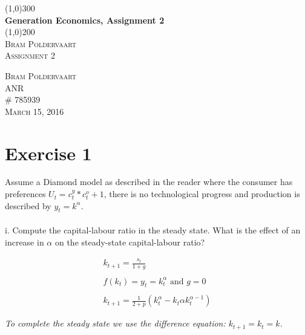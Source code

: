 \documentclass{article}
\begin{document}
\begin{titlepage}
	\begin{center}
	\line(1,0){300} \\
	[2mm]
	\huge{\bfseries Generation Economics, Assignment 2} \\
	[2mm]
	\line(1,0){200}\\
	[1,5cm]
	\textsc{\LARGE Bram Poldervaart} \\
	[0.75cm]
	\textsc{\Large Assignment 2 }\\ 
	[9cm]
	\end{center}
	\begin{flushright}
	\textsc{\large Bram Poldervaart \\
	ANR \\
	\# 785939 \\
	March 15, 2016 \\}
	\end{flushright}
	
\end{titlepage}

\section{Exercise 1}\label {sec:ex1}
Assume a Diamond model as described in the reader where the consumer has preferences $U_t = c^y_t*c^o_t+1$, there is no technological progress and production is described by $y_t = k^\alpha$.
\\
\\
i. Compute the capital-labour ratio in the steady state. What is the effect of an increase in $\alpha$ on the steady-state capital-labour ratio?

\begin{eqnarray} 
k_{t+1}= \frac{s_t }{1+g}  \nonumber \\
\nonumber \\ 
f(k_t)=y_t = k^\alpha_t \mbox{ and } g=0 \nonumber \\
\nonumber \\
k_{t+1} = \frac {1}{2+p} (k^\alpha_t - k_t\alpha k_t^{\alpha-1}) \nonumber 
\end{eqnarray}

\textit{To complete the steady state we use the difference equation: $k_{t+1} = k_t = k$.} \\
\end{document}
